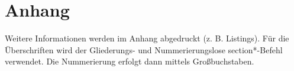 \chapter*{Anhang}
Weitere Informationen werden im Anhang abgedruckt (z. B. Listings). Für die Überschriften wird der Gliederungs- und Nummerierungslose section*-Befehl verwendet. Die Nummerierung erfolgt dann mittels Großbuchstaben. 
